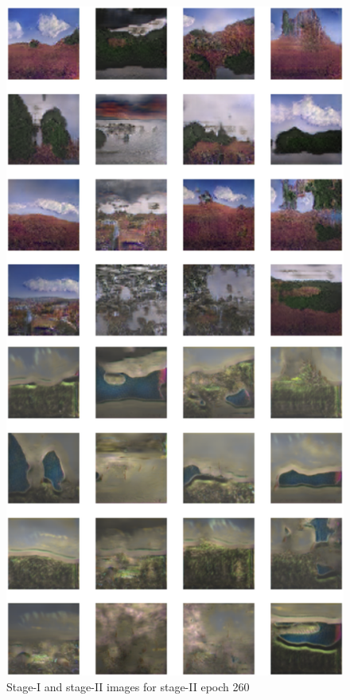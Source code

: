 \documentclass{article}
\begin{document}
	\begin{figure}[h]
	\centering
	\includegraphics[scale=0.6]{images/epoch260_FID431.png}
	\caption{Stage-I and stage-II images for stage-II epoch 260}
	\end{figure}
\end{document}
